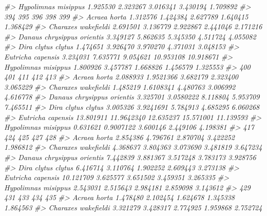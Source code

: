 \documentclass[
]{article}
\newenvironment{Shaded}{\begin{snugshade}}{\end{snugshade}}
\newcommand{\CommentTok}[1]{\textcolor[rgb]{0.56,0.35,0.01}{\textit{#1}}}
\begin{document}
\begin{Shaded}
\begin{Highlighting}[]
\CommentTok{\#\textgreater{} Hypolimnas misippus        1.925530 2.323267 3.016341 3.430194 1.709892}
\CommentTok{\#\textgreater{}                                 394      395      396       398       399}
\CommentTok{\#\textgreater{} Acraea horta               1.312576 1.424384 2.627789  1.640415  1.368429}
\CommentTok{\#\textgreater{} Charaxes wakefieldi        2.691501 3.136779 2.922867  2.441046  2.171216}
\CommentTok{\#\textgreater{} Danaus chrysippus orientis 3.349127 5.862635 5.345350  4.511724  4.055082}
\CommentTok{\#\textgreater{} Dira clytus clytus         1.474651 3.926470 3.970270  4.371031  3.048153}
\CommentTok{\#\textgreater{} Eutricha capensis          3.234031 7.635771 9.054621 10.953108 10.918671}
\CommentTok{\#\textgreater{} Hypolimnas misippus        1.800926 3.457787 1.668826  1.456579  1.325553}
\CommentTok{\#\textgreater{}                                  400        401       411       412       413}
\CommentTok{\#\textgreater{} Acraea horta                2.088933  1.9521366  3.682179  2.323400  3.065229}
\CommentTok{\#\textgreater{} Charaxes wakefieldi         1.485219  1.6108341  4.480763  3.006992  4.616778}
\CommentTok{\#\textgreater{} Danaus chrysippus orientis  3.325701  3.0580222  8.118804  5.953709  7.465511}
\CommentTok{\#\textgreater{} Dira clytus clytus          3.005326  3.9241691  5.784913  4.685295  6.060268}
\CommentTok{\#\textgreater{} Eutricha capensis          13.801911 11.9642340 12.635237 15.571001 11.139593}
\CommentTok{\#\textgreater{} Hypolimnas misippus         0.631621  0.9007122  3.600146  2.449106  4.198381}
\CommentTok{\#\textgreater{}                                  417      424      425      427      428}
\CommentTok{\#\textgreater{} Acraea horta                2.854386 4.796761 2.870704 3.422252 1.986812}
\CommentTok{\#\textgreater{} Charaxes wakefieldi         4.368637 3.804363 3.073690 3.481819 3.647234}
\CommentTok{\#\textgreater{} Danaus chrysippus orientis  7.442839 3.881367 3.517248 3.783173 3.928756}
\CommentTok{\#\textgreater{} Dira clytus clytus          6.416714 3.110764 1.902252 2.609443 3.273138}
\CommentTok{\#\textgreater{} Eutricha capensis          10.121709 3.625577 3.651502 3.459351 3.265335}
\CommentTok{\#\textgreater{} Hypolimnas misippus         2.543031 2.515643 2.984181 2.859098 3.143612}
\CommentTok{\#\textgreater{}                                 429      431      433       434      435}
\CommentTok{\#\textgreater{} Acraea horta               1.478480 2.102454 1.624678  1.345338 1.864563}
\CommentTok{\#\textgreater{} Charaxes wakefieldi        3.321279 3.428317 2.774925  1.959868 2.752724}

\end{Highlighting}
\end{Shaded}
\end{document}
